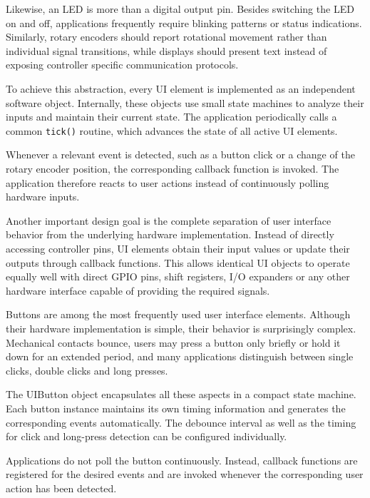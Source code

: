 Likewise, an LED is more than a digital output pin. Besides switching the LED on
and off, applications frequently require blinking patterns or status
indications. Similarly, rotary encoders should report rotational movement rather
than individual signal transitions, while displays should present text instead
of exposing controller specific communication protocols.

To achieve this abstraction, every UI element is implemented as an independent
software object. Internally, these objects use small state machines to analyze
their inputs and maintain their current state. The application periodically
calls a common \texttt{tick()} routine, which advances the state of all active
UI elements.

Whenever a relevant event is detected, such as a button click or a change of the
rotary encoder position, the corresponding callback function is invoked. The
application therefore reacts to user actions instead of continuously polling
hardware inputs.

Another important design goal is the complete separation of user interface
behavior from the underlying hardware implementation. Instead of directly
accessing controller pins, UI elements obtain their input values or update their
outputs through callback functions. This allows identical UI objects to operate
equally well with direct GPIO pins, shift registers, I/O expanders or any other
hardware interface capable of providing the required signals.


Buttons are among the most frequently used user interface elements. Although
their hardware implementation is simple, their behavior is surprisingly
complex. Mechanical contacts bounce, users may press a button only briefly or
hold it down for an extended period, and many applications distinguish between
single clicks, double clicks and long presses.

The UIButton object encapsulates all these aspects in a compact state machine.
Each button instance maintains its own timing information and generates the
corresponding events automatically. The debounce interval as well as the timing
for click and long-press detection can be configured individually.

Applications do not poll the button continuously. Instead, callback functions
are registered for the desired events and are invoked whenever the corresponding
user action has been detected.

